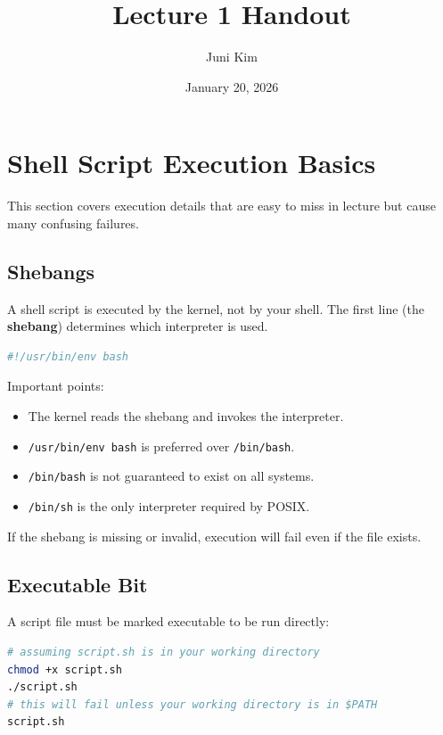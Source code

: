 \documentclass{../juni}
\author{Juni Kim}
\title{Lecture 1 Handout}
\date{January 20, 2026}
\begin{document}
\maketitle

\tableofcontents

\newpage

\section{Shell Script Execution Basics}

This section covers execution details that are easy to miss in lecture but
cause many confusing failures.

\subsection{Shebangs}

A shell script is executed by the kernel, not by your shell. The first line
(the \textbf{shebang}) determines which interpreter is used.

\begin{lstlisting}[language=bash]
#!/usr/bin/env bash
\end{lstlisting}

Important points:
\begin{itemize}
  \item The kernel reads the shebang and invokes the interpreter.
  \item \texttt{/usr/bin/env bash} is preferred over \texttt{/bin/bash}.
  \item \texttt{/bin/bash} is not guaranteed to exist on all systems.
  \item \texttt{/bin/sh} is the only interpreter required by POSIX.
\end{itemize}

If the shebang is missing or invalid, execution will fail even if the file
exists.

\subsection{Executable Bit}

A script file must be marked executable to be run directly:

\begin{lstlisting}[language=bash]
# assuming script.sh is in your working directory
chmod +x script.sh
./script.sh
# this will fail unless your working directory is in $PATH
script.sh
\end{lstlisting}
\end{document}
